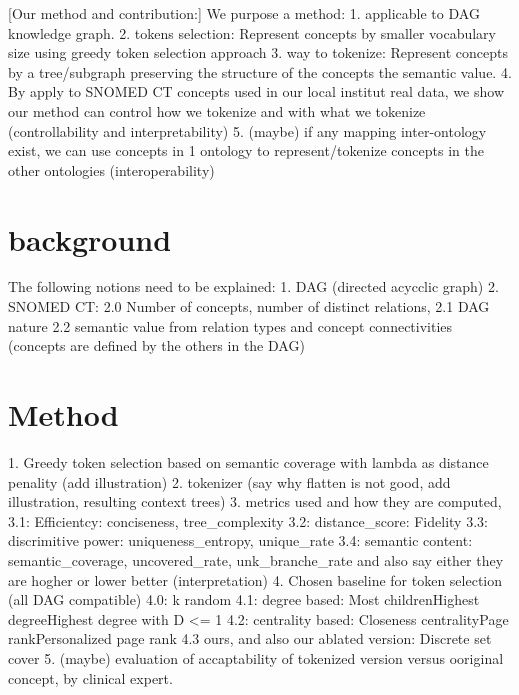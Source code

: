 \documentclass{article}
\begin{document}
[Our method and contribution:]
We purpose a method:
1. applicable to DAG knowledge graph.
2. tokens selection: Represent concepts by smaller vocabulary size using greedy token selection approach
3. way to tokenize: Represent concepts by a tree/subgraph preserving the structure of the concepts the semantic value.
4. By apply to SNOMED CT concepts used in our local institut real data, we show our method can control how we tokenize and with what we tokenize (controllability and interpretability)
5. (maybe) if any mapping inter-ontology exist, we can use concepts in 1 ontology to represent/tokenize concepts in the other ontologies (interoperability)


\section{background}
The following notions need to be explained:
1. DAG (directed acycclic graph)
2. SNOMED CT:
2.0 Number of concepts, number of distinct relations,
2.1 DAG nature
2.2 semantic value from relation types and concept connectivities (concepts are defined by the others in the DAG)

\section{Method}
1. Greedy token selection based on semantic coverage with lambda as distance penality (add illustration)
2. tokenizer (say why flatten is not good, add illustration, resulting context trees)
3. metrics used and how they are computed,
3.1: Efficientcy: conciseness, tree_complexity
3.2: distance_score: Fidelity
3.3: discrimitive power: uniqueness_entropy, unique_rate
3.4: semantic content: semantic_coverage, uncovered_rate, unk_branche_rate
and also say either they are hogher or lower better (interpretation)
4. Chosen baseline for token selection (all DAG compatible)
4.0: k random
4.1: degree based: Most childrenHighest degreeHighest degree with D <= 1
4.2: centrality based: Closeness centralityPage rankPersonalized page rank
4.3 ours, and also our ablated version: Discrete set cover
5. (maybe) evaluation of accaptability of tokenized version versus ooriginal concept, by clinical expert.
\end{document}
